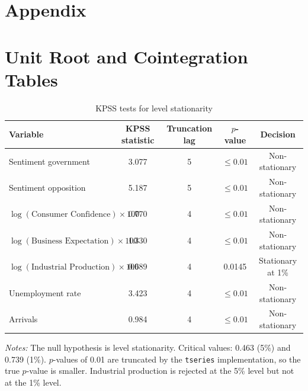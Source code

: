 \documentclass[12pt]{scrartcl}
\numberwithin{equation}{section}				%
\begin{document}
	\clearpage
	\section*{Appendix}
	
	\section{Unit Root and Cointegration Tables}
	
	\begin{table}[htbp]
		\centering
		\begin{threeparttable}
			\caption{KPSS tests for level stationarity}
			\label{tab:kpss_level}
			\begin{tabular}{lcccc}
				\toprule
				Variable & KPSS statistic & Truncation lag & $p$-value & Decision \\
				\midrule
				Sentiment government                 & 3.077 & 5 & $\leq 0.01$ & Non-stationary \\
				Sentiment opposition                 & 5.187 & 5 & $\leq 0.01$ & Non-stationary \\
				$\log(\text{Consumer Confidence})\times 100$      & 0.770 & 4 & $\leq 0.01$ & Non-stationary \\
				$\log(\text{Business Expectation})\times 100$     & 1.330 & 4 & $\leq 0.01$ & Non-stationary \\
				$\log(\text{Industrial Production})\times 100$    & 0.689 & 4 & 0.0145      & Stationary at 1\% \\
				Unemployment rate                    & 3.423 & 4 & $\leq 0.01$ & Non-stationary \\
				Arrivals                             & 0.984 & 4 & $\leq 0.01$ & Non-stationary \\
				\bottomrule
			\end{tabular}
			\begin{tablenotes}
				\small
				\item \textit{Notes:} The null hypothesis is level stationarity. Critical values: 0.463 (5\%) and 0.739 (1\%).
				$p$-values of 0.01 are truncated by the \texttt{tseries} implementation, so the true $p$-value is smaller. Industrial production is rejected at the 5\% level but not at the 1\% level.
			\end{tablenotes}
		\end{threeparttable}
	\end{table} 
\end{document}
